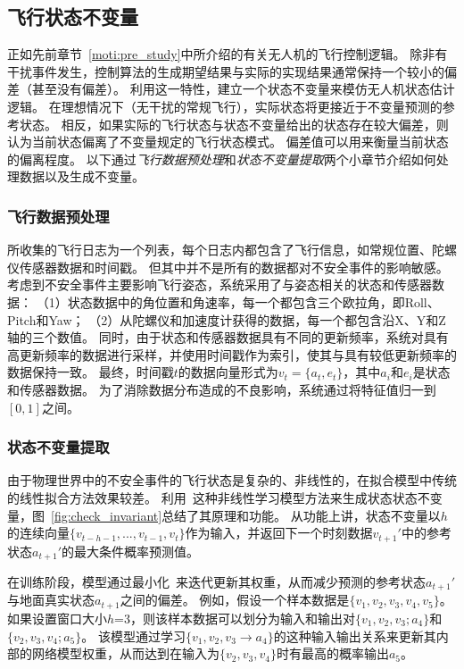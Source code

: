 \subsection{飞行状态不变量}
正如先前章节~\ref{moti:pre_study}中所介绍的有关无人机的飞行控制逻辑。
除非有干扰事件发生，控制算法的生成期望结果与实际的实现结果通常保持一个较小的偏差（甚至没有偏差）。
利用这一特性，\deccheck 建立一个状态不变量来模仿无人机状态估计逻辑。
在理想情况下（无干扰的常规飞行），实际状态将更接近于不变量预测的参考状态。
相反，如果实际的飞行状态与状态不变量给出的状态存在较大偏差，则认为当前状态偏离了不变量规定的飞行状态模式。
偏差值可以用来衡量当前状态的偏离程度。
以下通过\emph{飞行数据预处理}和\emph{状态不变量提取}两个小章节介绍如何处理数据以及生成不变量。

\subsubsection{飞行数据预处理}
所收集的飞行日志为一个列表，每个日志内都包含了飞行信息，如常规位置、陀螺仪传感器数据和时间戳。
但其中并不是所有的数据都对不安全事件的影响敏感。
考虑到不安全事件主要影响飞行姿态，系统采用了与姿态相关的状态和传感器数据：
（1）状态数据中的角位置和角速率，每一个都包含三个欧拉角，即Roll、Pitch和Yaw；
（2）从陀螺仪和加速度计获得的数据，每一个都包含沿X、Y和Z轴的三个数值。
同时，由于状态和传感器数据具有不同的更新频率，系统对具有高更新频率的数据进行采样，并使用时间戳作为索引，使其与具有较低更新频率的数据保持一致。
最终，时间戳$t$的数据向量形式为$v_t=\{a_t, e_t\}$，其中$a_i$和$e_i$是状态和传感器数据。
为了消除数据分布造成的不良影响，系统通过将特征值归一到$[0, 1]$之间。


\subsubsection{状态不变量提取}
由于物理世界中的不安全事件的飞行状态是复杂的、非线性的，在拟合模型中传统的线性拟合方法效果较差。
\deccheck 利用~\cite{hochreiter1997long}这种非线性学习模型方法来生成状态状态不变量，图~\ref{fig:check_invariant}总结了其原理和功能。
从功能上讲，状态不变量以$h$的连续向量$\{v_{t-h-1},...,v_{t-1},v_t\}$作为输入，并返回下一个时刻数据$v_{t+1}'$中的参考状态$a_{t+1}'$的最大条件概率预测值。

在训练阶段，模型通过最小化~\cite{4775883}来迭代更新其权重，从而减少预测的参考状态$a_{t+1}'$与地面真实状态$a_{t+1}$之间的偏差。
例如，假设一个样本数据是$\{v_1,v_2,v_3,v_4,v_5\}$。
如果设置窗口大小$h$=3，则该样本数据可以划分为输入和输出对$\{v_1,v_2,v_3; a_4\}$和$\{v_2,v_3,v_4; a_5\}$。
该模型通过学习$\{v_1,v_2,v_3\rightarrow a_4\}$的这种输入输出关系来更新其内部的网络模型权重，从而达到在输入为$\{v_2,v_3,v_4\}$时有最高的概率输出$a_5$。


